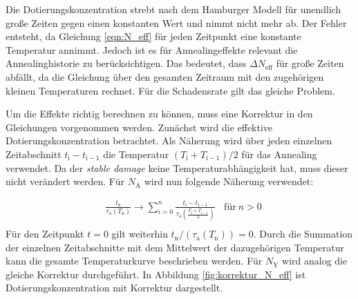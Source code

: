 Die Dotierungskonzentration strebt nach dem Hamburger Modell
für unendlich große Zeiten gegen einen konstanten Wert und nimmt nicht mehr
ab.
Der Fehler entsteht, da Gleichung \ref{eqn:N_eff} für jeden
Zeitpunkt eine konstante Temperatur annimmt. Jedoch ist es für Annealingeffekte
relevant die Annealinghistorie zu berücksichtigen.
Das bedeutet, dass $\Delta N_{\mathrm{eff}}$ für große Zeiten abfällt, da die Gleichung über den
gesamten Zeitraum mit den zugehörigen kleinen Temperaturen rechnet. Für
die Schadensrate gilt das gleiche Problem.

Um die Effekte richtig berechnen zu können, muss eine Korrektur in den
Gleichungen vorgenommen werden.
Zunächst wird die effektive Dotierungskonzentration betrachtet. Als Näherung wird über
jeden einzelnen Zeitabschnitt $t_{\mathrm{i}} - t_{\mathrm{i-1}}$ die
Temperatur $(T_{\mathrm{i}} +T_{\mathrm{i-1}})/2$ für das Annealing verwendet.
Da der \textit{stable damage} keine Temperaturabhängigkeit hat, muss dieser nicht
verändert werden. Für $N_{\mathrm{A}}$ wird nun folgende Näherung
verwendet:

\begin{align}
  &\frac{t_{\mathrm{n}}}{\tau_{\mathrm{a}}(T_{\mathrm{n}})} \rightarrow \sum_{i=0}^n  \frac{t_{\mathrm{i}} - t_{\mathrm{i-1}}}{\tau_{\mathrm{a}}(\frac{T_{\mathrm{i}} +T_{\mathrm{i-1}}}{2})} \:\:\:\: \text{für} \: n>0 \\
\end{align}
Für den Zeitpunkt $t=0$ gilt weiterhin $t_{\mathrm{n}}/(\tau_{\mathrm{a}}(T_{\mathrm{n}})) = 0$.
Durch die Summation der einzelnen Zeitabschnitte mit dem Mittelwert der dazugehörigen
Temperatur kann die gesamte Temperaturkurve beschrieben werden. Für $N_{\mathrm{Y}}$
wird analog die gleiche Korrektur durchgeführt.
In Abbildung \ref{fig:korrektur_N_eff} ist Dotierungskonzentration mit Korrektur dargestellt.


